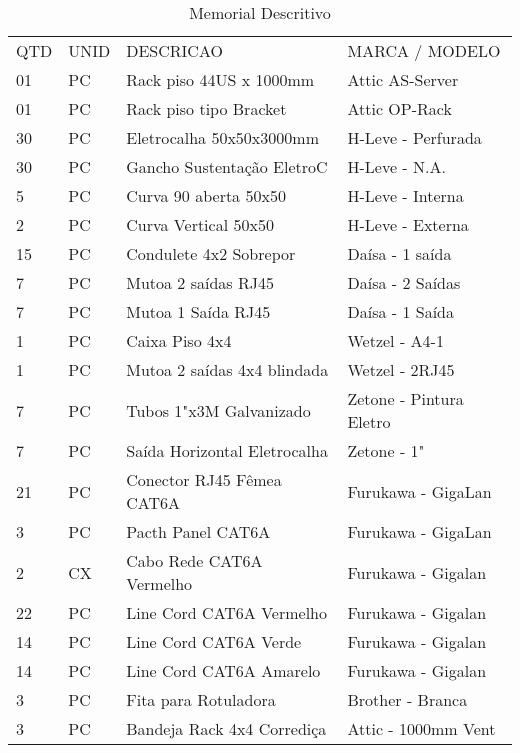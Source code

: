 \begin{table}[h!]
\centering
\caption{Memorial Descritivo}
\label{Memorial Descritivo}
\begin{tabular}{llll}
QTD & UNID & DESCRICAO                     & MARCA / MODELO          \\
01  & PC   & Rack piso 44US x 1000mm       & Attic AS-Server         \\
01  & PC   & Rack piso tipo Bracket        & Attic OP-Rack           \\
30  & PC   & Eletrocalha 50x50x3000mm      & H-Leve - Perfurada      \\
30  & PC   & Gancho Sustentação EletroC    & H-Leve - N.A.           \\
5   & PC   & Curva 90 aberta 50x50         & H-Leve - Interna        \\
2   & PC   & Curva Vertical 50x50          & H-Leve - Externa        \\
15  & PC   & Condulete 4x2 Sobrepor        & Daísa - 1 saída         \\
7   & PC   & Mutoa 2 saídas RJ45           & Daísa - 2 Saídas        \\
7   & PC   & Mutoa 1 Saída RJ45            & Daísa - 1 Saída         \\
1   & PC   & Caixa Piso 4x4                & Wetzel - A4-1           \\
1   & PC   & Mutoa 2 saídas 4x4 blindada   & Wetzel - 2RJ45          \\
7   & PC   & Tubos 1"x3M Galvanizado       & Zetone - Pintura Eletro \\
7   & PC   & Saída Horizontal Eletrocalha  & Zetone - 1"             \\
21  & PC   & Conector RJ45 Fêmea CAT6A     & Furukawa - GigaLan      \\
3   & PC   & Pacth Panel CAT6A             & Furukawa - GigaLan      \\
2   & CX   & Cabo Rede CAT6A Vermelho      & Furukawa - Gigalan      \\
22  & PC   & Line Cord CAT6A Vermelho      & Furukawa - Gigalan      \\
14  & PC   & Line Cord CAT6A Verde         & Furukawa - Gigalan      \\
14  & PC   & Line Cord CAT6A Amarelo       & Furukawa - Gigalan      \\
3   & PC   & Fita para Rotuladora          & Brother - Branca        \\
3   & PC   & Bandeja Rack 4x4 Corrediça    & Attic - 1000mm Vent     \\

\end{tabular}
\end{table}
